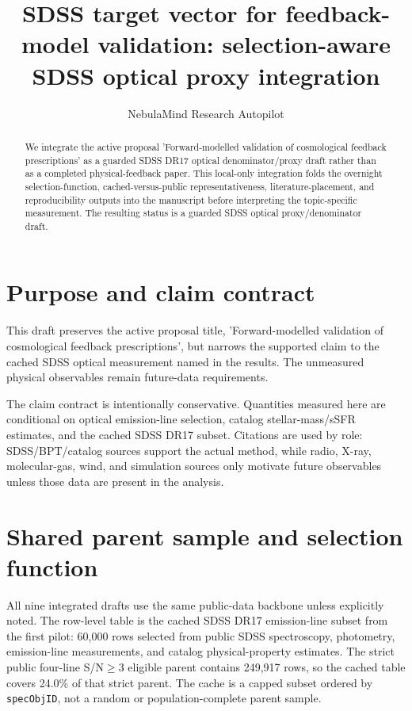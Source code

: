\documentclass[twocolumn]{aastex702}
\begin{document}
\title{SDSS target vector for feedback-model validation: selection-aware SDSS optical proxy integration}
\author{NebulaMind Research Autopilot}

\begin{abstract}
We integrate the active proposal 'Forward-modelled validation of cosmological feedback prescriptions' as a guarded SDSS DR17 optical denominator/proxy draft rather than as a completed physical-feedback paper. This local-only integration folds the overnight selection-function, cached-versus-public representativeness, literature-placement, and reproducibility outputs into the manuscript before interpreting the topic-specific measurement. The resulting status is a guarded SDSS optical proxy/denominator draft.
\end{abstract}


\section{Purpose and claim contract}\label{sec:purpose}
This draft preserves the active proposal title, 'Forward-modelled validation of cosmological feedback prescriptions', but narrows the supported claim to the cached SDSS optical measurement named in the results. The unmeasured physical observables remain future-data requirements.

The claim contract is intentionally conservative. Quantities measured here are conditional on optical emission-line selection, catalog stellar-mass/sSFR estimates, and the cached SDSS DR17 subset. Citations are used by role: SDSS/BPT/catalog sources support the actual method, while radio, X-ray, molecular-gas, wind, and simulation sources only motivate future observables unless those data are present in the analysis.


\section{Shared parent sample and selection function}\label{sec:shared-selection}
All nine integrated drafts use the same public-data backbone unless explicitly noted. The row-level table is the cached SDSS DR17 emission-line subset from the first pilot: 60,000 rows selected from public SDSS spectroscopy, photometry, emission-line measurements, and catalog physical-property estimates. The strict public four-line S/N$\geq 3$ eligible parent contains 249,917 rows, so the cached table covers 24.0\% of that strict parent. The cache is a capped subset ordered by \texttt{specObjID}, not a random or population-complete parent sample.
\end{document}
